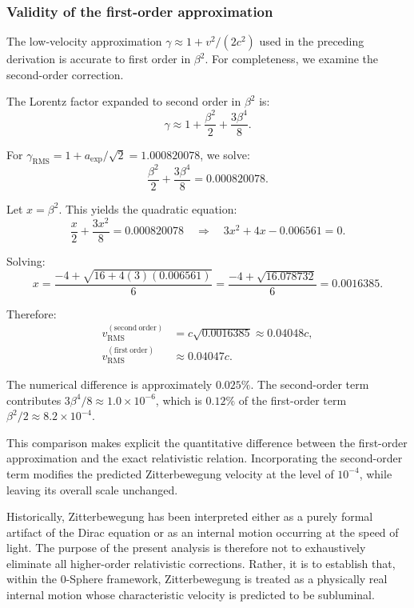 \documentclass[12pt,letterpaper]{article}
\begin{document}
\subsubsection{Validity of the first-order approximation}

The low-velocity approximation $\gamma \approx 1 + v^2/(2c^2)$ used in the preceding derivation is accurate to first order in $\beta^2$. For completeness, we examine the second-order correction.

The Lorentz factor expanded to second order in $\beta^2$ is:
\begin{equation}
\gamma \approx 1 + \frac{\beta^2}{2} + \frac{3\beta^4}{8}.
\end{equation}

For $\gamma_{\mathrm{RMS}} = 1 + a_{\mathrm{exp}}/\sqrt{2} = 1.000820078$, we solve:
\begin{equation}
\frac{\beta^2}{2} + \frac{3\beta^4}{8} = 0.000820078.
\end{equation}

Let $x = \beta^2$. This yields the quadratic equation:
\begin{equation}
\frac{x}{2} + \frac{3x^2}{8} = 0.000820078 \quad \Rightarrow \quad 3x^2 + 4x - 0.006561 = 0.
\end{equation}

Solving:
\begin{equation}
x = \frac{-4 + \sqrt{16 + 4(3)(0.006561)}}{6} = \frac{-4 + \sqrt{16.078732}}{6} = 0.0016385.
\end{equation}

Therefore:
\begin{align}
v_{\mathrm{RMS}}^{(\mathrm{second\ order})} &= c\sqrt{0.0016385} \approx 0.04048c, \\
v_{\mathrm{RMS}}^{(\mathrm{first\ order})} &\approx 0.04047c.
\end{align}

The numerical difference is approximately $0.025\%$. The second-order term contributes $3\beta^4/8 \approx 1.0 \times 10^{-6}$, which is $0.12\%$ of the first-order term $\beta^2/2 \approx 8.2 \times 10^{-4}$.

This comparison makes explicit the quantitative difference between the first-order approximation and the exact relativistic relation. Incorporating the second-order term modifies the predicted Zitterbewegung velocity at the level of $10^{-4}$, while leaving its overall scale unchanged.

Historically, Zitterbewegung has been interpreted either as a purely formal artifact of the Dirac equation or as an internal motion occurring at the speed of light. The purpose of the present analysis is therefore not to exhaustively eliminate all higher-order relativistic corrections. Rather, it is to establish that, within the 0-Sphere framework, Zitterbewegung is treated as a physically real internal motion whose characteristic velocity is predicted to be subluminal.
\end{document}
